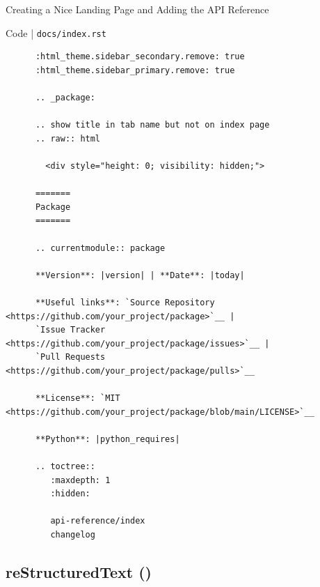 \begin{frame}[fragile]{Creating a Nice Landing Page and Adding the API Reference}
  \begin{block}{Code | \texttt{docs/index.rst}}
    \scriptsize
    \begin{verbatim}
      :html_theme.sidebar_secondary.remove: true
      :html_theme.sidebar_primary.remove: true

      .. _package:

      .. show title in tab name but not on index page
      .. raw:: html

        <div style="height: 0; visibility: hidden;">

      =======
      Package
      =======

      .. currentmodule:: package

      **Version**: |version| | **Date**: |today|

      **Useful links**: `Source Repository <https://github.com/your_project/package>`__ |
      `Issue Tracker <https://github.com/your_project/package/issues>`__ |
      `Pull Requests <https://github.com/your_project/package/pulls>`__

      **License**: `MIT <https://github.com/your_project/package/blob/main/LICENSE>`__

      **Python**: |python_requires|

      .. toctree::
         :maxdepth: 1
         :hidden:

         api-reference/index
         changelog
    \end{verbatim}
  \end{block}
\end{frame}

\subsection{reStructuredText (\reST)}

